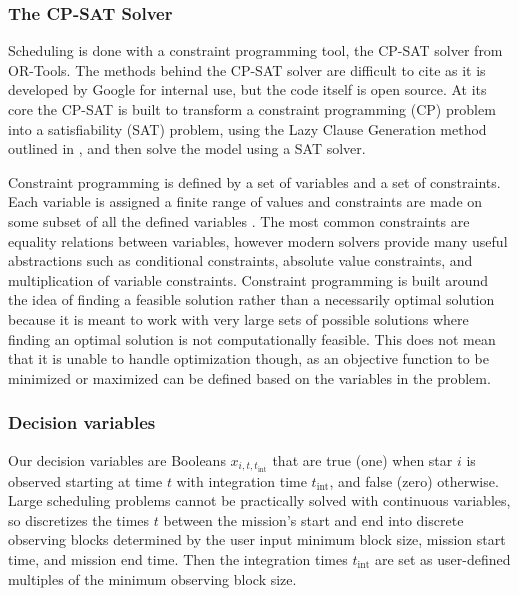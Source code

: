 \subsubsection{The CP-SAT Solver}

Scheduling is done with a constraint programming tool, the CP-SAT solver from
OR-Tools\citep{perronORTools2022}. The methods behind the CP-SAT solver are
difficult to cite as it is developed by Google for internal use, but the code
itself is open source. At its core the CP-SAT is built to transform a
constraint programming (CP) problem into a satisfiability (SAT) problem, using
the Lazy Clause Generation method outlined in \citet{feydyLazyClause2009a}, and
then solve the model using a SAT solver.


Constraint programming is defined by a set of variables and a set of
constraints. Each variable is assigned a finite range of values and constraints
are made on some subset of all the defined variables
\citep{shawConstraintProgramming2002}. The most common constraints are equality
relations between variables, however modern solvers provide many useful
abstractions such as conditional constraints, absolute value constraints, and
multiplication of variable constraints. Constraint programming is built around
the idea of finding a feasible solution rather than a necessarily optimal
solution because it is meant to work with very large sets of possible solutions
where finding an optimal solution is not computationally feasible. This does
not mean that it is unable to handle optimization though, as an objective
function to be minimized or maximized can be defined based on the variables in
the problem.





\subsubsection{Decision variables}

Our decision variables are Booleans $x_{i, t, t_{\textrm{int}}}$ that are true
(one) when star $i$ is observed starting at time $t$ with integration time
$t_{\textrm{int}}$, and false (zero) otherwise. Large scheduling problems
cannot be practically solved with continuous variables, so 
discretizes the times $t$ between the mission's start and end into discrete
observing blocks determined by the user input minimum block size, mission start
time, and mission end time. Then the integration times $t_{\textrm{int}}$ are
set as user-defined multiples of the minimum observing block size.

